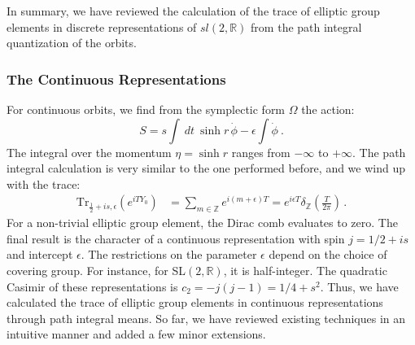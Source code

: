 \documentclass[12pt]{article}
\numberwithin{equation}{section}
\numberwithin{equation}{section}
\numberwithin{table}{section}\setlength{\multlinegap}{25pt}
\begin{document}
In summary, we have reviewed the calculation of  the trace of elliptic group elements in discrete representations of $sl(2,\mathbb{R})$ from the path integral quantization of the orbits.

\subsubsection{The Continuous Representations}
For continuous orbits, we find from the symplectic form $\Omega$ the action:
\begin{equation}
S = s \int~ dt~\sinh r \, \dot{\phi} -  \epsilon \int \dot{\phi}~.
\end{equation}
The integral over the momentum $\eta = \sinh r$ ranges from $-\infty$ to $+\infty$. The path integral calculation is very similar to the one performed before, and we wind up with the trace: 
\begin{align}
\text{Tr}_{\frac{1}{2}+is,\epsilon} \left(e^{i T Y_0} \right) &= \sum_{m \in \mathbb{Z}} e^{i   (m+\epsilon)T}
= e^{i   \epsilon T}  \delta_{\mathbb{Z}} (\frac{ T}{2 \pi}) %
\, .
\end{align}
For a non-trivial elliptic group element, the Dirac comb evaluates to zero. The final result is the character of a continuous representation with spin $j=1/2+is$ and intercept $\epsilon$. The restrictions on the parameter $\epsilon$ depend on the choice of covering group. For instance, for SL$(2,\mathbb{R})$, it is half-integer. The quadratic Casimir of these representations is $c_2=-j(j-1)=1/4+s^2$. 
Thus, we have calculated the trace of elliptic group elements in continuous representations through path integral means. So far, we have reviewed existing techniques in an intuitive manner and added a few minor extensions. 
\end{document}
